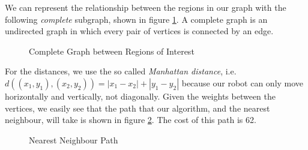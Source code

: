We can represent the relationship between the regions in our graph with the following \textit{complete} subgraph, shown in figure \ref{fig:completeGraph}. A complete graph is an undirected graph in which every pair of vertices is connected by an edge. 
\begin{figure}
\centering
{}
\caption{Complete Graph between Regions of Interest}
\label{fig:completeGraph}
\end{figure}

For the distances, we use the so called \textit{Manhattan distance}, i.e.\ $d((x_1,y_1),(x_2,y_2)) = |x_1 - x_2| +| y_1 - y_2|$ because our robot can only move horizontally and vertically, not diagonally. Given the weights between the vertices, we easily see that the path that our algorithm, and the nearest neighbour, will take is shown in figure \ref{fig:pathOnComplete}. The cost of this path is 62.

\begin{figure}
\centering
{}
\caption{Nearest Neighbour Path}
\label{fig:pathOnComplete}
\end{figure}

